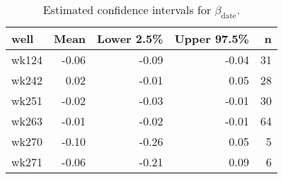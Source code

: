 \begin{table}[ht]
\centering
\begin{tabular}{lrrrr}
  \hline
well & Mean & Lower 2.5\% & Upper 97.5\% & n \\ 
  \hline
wk124 & -0.06 & -0.09 & -0.04 &  31 \\ 
  wk242 & 0.02 & -0.01 & 0.05 &  28 \\ 
  wk251 & -0.02 & -0.03 & -0.01 &  30 \\ 
  wk263 & -0.01 & -0.02 & -0.01 &  64 \\ 
  wk270 & -0.10 & -0.26 & 0.05 &   5 \\ 
  wk271 & -0.06 & -0.21 & 0.09 &   6 \\ 
   \hline
\end{tabular}
\caption{Estimated confidence intervals for $\beta_\text{date}$.} 
\label{tab:beta_date}
\end{table}
